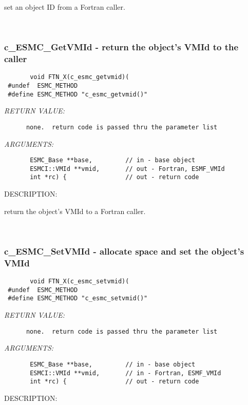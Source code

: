        set an object ID from a Fortran caller.
   
 
\mbox{}\hrulefill\
 
\subsubsection [c\_ESMC\_GetVMId] {c\_ESMC\_GetVMId - return the object's VMId to the caller}


  
\begin{verbatim}       void FTN_X(c_esmc_getvmid)(
 #undef  ESMC_METHOD
 #define ESMC_METHOD "c_esmc_getvmid()"\end{verbatim}{\em RETURN VALUE:}
\begin{verbatim}      none.  return code is passed thru the parameter list
   \end{verbatim}{\em ARGUMENTS:}
\begin{verbatim}       ESMC_Base **base,         // in - base object
       ESMCI::VMId **vmid,       // out - Fortran, ESMF_VMId
       int *rc) {                // out - return code
   \end{verbatim}
{\sf DESCRIPTION:\\ }


       return the object's VMId to a Fortran caller.
   
 
\mbox{}\hrulefill\
 
\subsubsection [c\_ESMC\_SetVMId] {c\_ESMC\_SetVMId - allocate space and set the object's VMId }


  
\begin{verbatim}       void FTN_X(c_esmc_setvmid)(
 #undef  ESMC_METHOD
 #define ESMC_METHOD "c_esmc_setvmid()"\end{verbatim}{\em RETURN VALUE:}
\begin{verbatim}      none.  return code is passed thru the parameter list
   \end{verbatim}{\em ARGUMENTS:}
\begin{verbatim}       ESMC_Base **base,         // in - base object
       ESMCI::VMId **vmid,       // in - Fortran, ESMF_VMId
       int *rc) {                // out - return code
   \end{verbatim}
{\sf DESCRIPTION:\\ }


